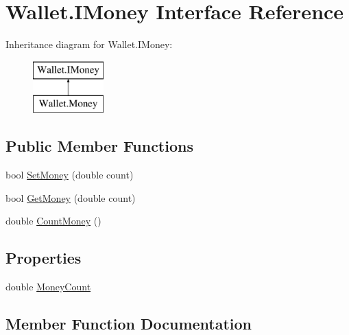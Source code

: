 \hypertarget{interface_wallet_1_1_i_money}{}\section{Wallet.\+I\+Money Interface Reference}
\label{interface_wallet_1_1_i_money}
Inheritance diagram for Wallet.\+I\+Money\+:\begin{figure}[H]
\begin{center}
\leavevmode
\includegraphics[height=2.000000cm]{interface_wallet_1_1_i_money}
\end{center}
\end{figure}
\subsection*{Public Member Functions}
\begin{DoxyCompactItemize}
\item 
bool \hyperlink{interface_wallet_1_1_i_money_a73409586903369db2c15c60623731834}{Set\+Money} (double count)
\item 
bool \hyperlink{interface_wallet_1_1_i_money_a7eb41b256ff191c87f5bca82504244fe}{Get\+Money} (double count)
\item 
double \hyperlink{interface_wallet_1_1_i_money_a040ef42d0e14737cfc2342a5a824442b}{Count\+Money} ()
\end{DoxyCompactItemize}
\subsection*{Properties}
\begin{DoxyCompactItemize}
\item 
double \hyperlink{interface_wallet_1_1_i_money_aaaa21af85790646a6b0ff5021df66ea6}{Money\+Count}
\end{DoxyCompactItemize}


\subsection{Member Function Documentation}
\hypertarget{interface_wallet_1_1_i_money_a040ef42d0e14737cfc2342a5a824442b}{}\label{interface_wallet_1_1_i_money_a040ef42d0e14737cfc2342a5a824442b} 
